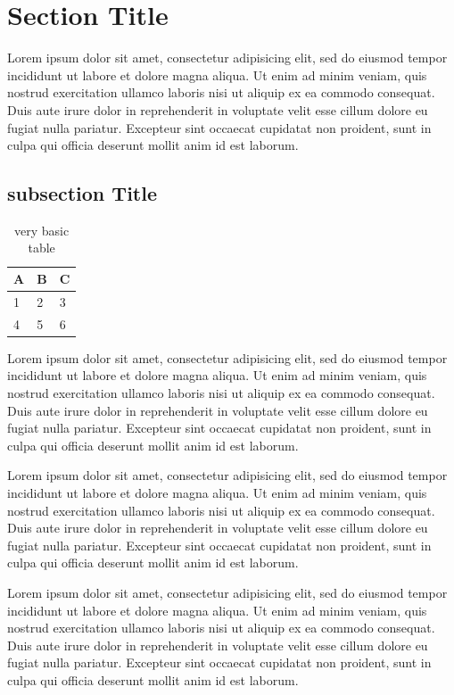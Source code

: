 \section{Section Title}
Lorem ipsum dolor sit amet, consectetur adipisicing elit, sed do eiusmod tempor incididunt ut labore et dolore magna aliqua. Ut enim ad minim veniam, quis nostrud exercitation ullamco laboris nisi ut aliquip ex ea commodo consequat. Duis aute irure dolor in reprehenderit in voluptate velit esse cillum dolore eu fugiat nulla pariatur. Excepteur sint occaecat cupidatat non proident, sunt in culpa qui officia deserunt mollit anim id est laborum.
\subsection{subsection Title}

\begin{table}[h]
\centering
\begin{tabular}{l | l | l}
A & B & C \\
\hline
1 & 2 & 3 \\
4 & 5 & 6
\end{tabular}
\caption{very basic table}
\label{tab:abc}
\end{table}

Lorem ipsum dolor sit amet, consectetur adipisicing elit, sed do eiusmod tempor incididunt ut labore et dolore magna aliqua. Ut enim ad minim veniam, quis nostrud exercitation ullamco laboris nisi ut aliquip ex ea commodo consequat. Duis aute irure dolor in reprehenderit in voluptate velit esse cillum dolore eu fugiat nulla pariatur. Excepteur sint occaecat cupidatat non proident, sunt in culpa qui officia deserunt mollit anim id est laborum.\cite{einstein}

Lorem ipsum dolor sit amet, consectetur adipisicing elit, sed do eiusmod tempor incididunt ut labore et dolore magna aliqua. Ut enim ad minim veniam, quis nostrud exercitation ullamco laboris nisi ut aliquip ex ea commodo consequat. Duis aute irure dolor in reprehenderit in voluptate velit esse cillum dolore eu fugiat nulla pariatur. Excepteur sint occaecat cupidatat non proident, sunt in culpa qui officia deserunt mollit anim id est laborum.

Lorem ipsum dolor sit amet, consectetur adipisicing elit, sed do eiusmod tempor incididunt ut labore et dolore magna aliqua. Ut enim ad minim veniam, quis nostrud exercitation ullamco laboris nisi ut aliquip ex ea commodo consequat. Duis aute irure dolor in reprehenderit in voluptate velit esse cillum dolore eu fugiat nulla pariatur. Excepteur sint occaecat cupidatat non proident, sunt in culpa qui officia deserunt mollit anim id est laborum.

